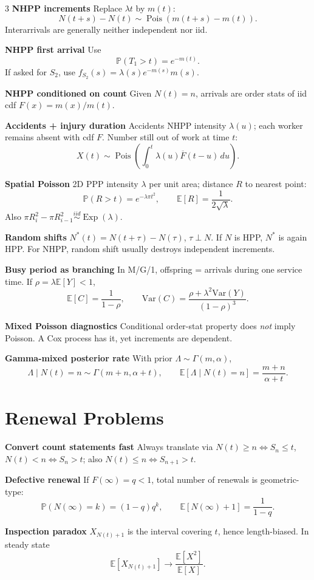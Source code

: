 \documentclass[a4paper,8pt,fleqn]{extarticle}
\newcommand{\E}{\mathbb{E}}
\newcommand{\PP}{\mathbb{P}}
\newcommand{\Var}{\mathrm{Var}}
\newcommand{\1}{\mathbf{1}}
\newcommand{\barF}{\overline{F}}
\newcommand{\sub}[1]{\textbf{#1} }
\DeclareMathOperator{\Pois}{Pois}
\DeclareMathOperator{\Exp}{Exp}
\begin{document}
\begin{multicols}{3}
\sub{NHPP increments} Replace \(\lambda t\) by \(m(t)\):
\[
N(t+s)-N(t)\sim \Pois(m(t+s)-m(t)).
\]
Interarrivals are generally neither independent nor iid.

\sub{NHPP first arrival} Use
\[
\PP(T_1>t)=e^{-m(t)}.
\]
If asked for \(S_2\), use \(f_{S_2}(s)=\lambda(s)e^{-m(s)}m(s)\).

\sub{NHPP conditioned on count} Given \(N(t)=n\), arrivals are order stats of iid cdf \(F(x)=m(x)/m(t)\).

\sub{Accidents + injury duration} Accidents NHPP intensity \(\lambda(u)\); each worker remains absent with cdf \(F\). Number still out of work at time \(t\):
\[
X(t)\sim \Pois\!\left(\int_0^t \lambda(u)\barF(t-u)\,du\right).
\]

\sub{Spatial Poisson} 2D PPP intensity \(\lambda\) per unit area; distance \(R\) to nearest point:
\[
\PP(R>t)=e^{-\lambda\pi t^2},\qquad \E[R]=\frac{1}{2\sqrt{\lambda}}.
\]
Also \(\pi R_i^2-\pi R_{i-1}^2\stackrel{iid}{\sim}\Exp(\lambda)\).

\sub{Random shifts} \(N^*(t)=N(t+\tau)-N(\tau)\), \(\tau\perp N\). If \(N\) is HPP, \(N^*\) is again HPP. For NHPP, random shift usually destroys independent increments.

\sub{Busy period as branching} In M/G/1, offspring = arrivals during one service time. If \(\rho=\lambda\E[Y]<1\),
\[
\E[C]=\frac{1}{1-\rho},\qquad
\Var(C)=\frac{\rho+\lambda^2\Var(Y)}{(1-\rho)^3}.
\]

\sub{Mixed Poisson diagnostics} Conditional order-stat property does \emph{not} imply Poisson. A Cox process has it, yet increments are dependent.

\sub{Gamma-mixed posterior rate} With prior \(\Lambda\sim\Gamma(m,\alpha)\),
\[
\Lambda\mid N(t)=n\sim \Gamma(m+n,\alpha+t),\qquad
\E[\Lambda\mid N(t)=n]=\frac{m+n}{\alpha+t}.
\]

\section*{Renewal Problems}
\sub{Convert count statements fast} Always translate via \(N(t)\ge n \iff S_n\le t\), \(N(t)<n \iff S_n>t\); also \(N(t)\le n \iff S_{n+1}>t\).

\sub{Defective renewal} If \(F(\infty)=q<1\), total number of renewals is geometric-type:
\[
\PP(N(\infty)=k)=(1-q)q^k,\qquad \E[N(\infty)+1]=\frac{1}{1-q}.
\]

\sub{Inspection paradox} \(X_{N(t)+1}\) is the interval covering \(t\), hence length-biased. In steady state
\[
\E[X_{N(t)+1}]\to \frac{\E[X^2]}{\E[X]}.
\]


\end{multicols}
\end{document}
